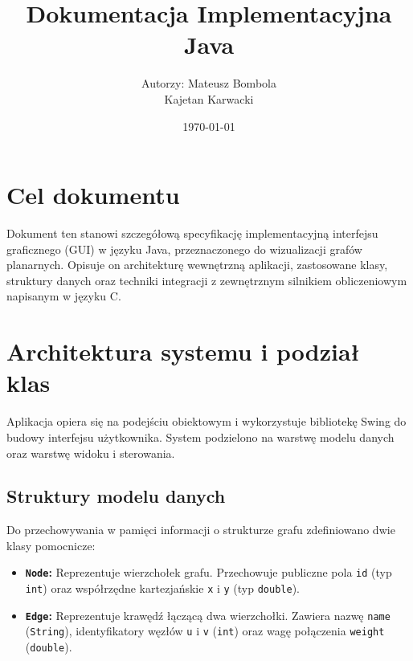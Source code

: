 \documentclass[12pt, a4paper]{article}
\title{\vspace*{3cm} \textbf{Dokumentacja Implementacyjna Java}}
\author{Autorzy: Mateusz Bombola \\ Kajetan Karwacki}
\date{\today}
\begin{document}
\maketitle
\thispagestyle{empty}

\newpage
\tableofcontents
\newpage

\section{Cel dokumentu}
Dokument ten stanowi szczegółową specyfikację implementacyjną interfejsu graficznego (GUI) w języku Java, przeznaczonego do wizualizacji grafów planarnych. Opisuje on architekturę wewnętrzną aplikacji, zastosowane klasy, struktury danych oraz techniki integracji z zewnętrznym silnikiem obliczeniowym napisanym w języku C.

\section{Architektura systemu i podział klas}
Aplikacja opiera się na podejściu obiektowym i wykorzystuje bibliotekę Swing do budowy interfejsu użytkownika. System podzielono na warstwę modelu danych oraz warstwę widoku i sterowania.

\subsection{Struktury modelu danych}
Do przechowywania w pamięci informacji o strukturze grafu zdefiniowano dwie klasy pomocnicze:
\begin{itemize}
    \item \textbf{\texttt{Node}:} Reprezentuje wierzchołek grafu. Przechowuje publiczne pola \texttt{id} (typ \texttt{int}) oraz współrzędne kartezjańskie \texttt{x} i \texttt{y} (typ \texttt{double}).
    \item \textbf{\texttt{Edge}:} Reprezentuje krawędź łączącą dwa wierzchołki. Zawiera nazwę \texttt{name} (\texttt{String}), identyfikatory węzłów \texttt{u} i \texttt{v} (\texttt{int}) oraz wagę połączenia \texttt{weight} (\texttt{double}).
\end{itemize}
\end{document}
